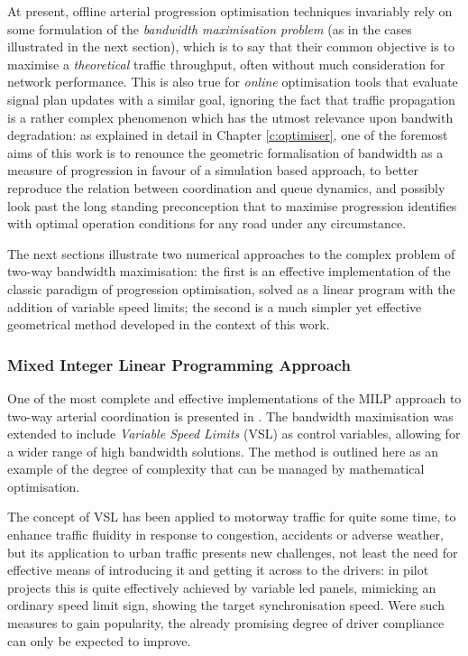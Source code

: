 At present, offline arterial progression optimisation techniques invariably rely on some formulation of the \emph{bandwidth maximisation problem} (as in the cases illustrated in the next section), which is to say that their common objective is to maximise a \emph{theoretical} traffic throughput, often without much consideration for network performance. This is also true for \emph{online} optimisation tools that evaluate signal plan updates with a similar goal, ignoring the fact that traffic propagation is a rather complex phenomenon which has the utmost relevance upon bandwith degradation: as explained in detail in Chapter \ref{c:optimiser}, one of the foremost aims of this work is to renounce the geometric formalisation of bandwidth as a measure of progression in favour of a simulation based approach, to better reproduce the relation between coordination and queue dynamics, and possibly look past the long standing preconception that to maximise progression identifies with optimal operation conditions for any road under any circumstance.

The next sections illustrate two numerical approaches to the complex problem of two-way bandwidth maximisation: the first is an effective implementation of the classic paradigm of progression optimisation, solved as a linear program with the addition of variable speed limits; the second is a much simpler yet effective geometrical method developed in the context of this work.

\subsubsection*{Mixed Integer Linear Programming Approach}
\newcommand{\tmod}[1]{{\| #1 \|}_t}
\newcommand{\intoffs}[1]{t_{#1}^{\scriptscriptstyle{\delta}}}
\newcommand{\reloffs}[1]{t_{#1}^{\scriptscriptstyle{\Delta}}}
One of the most complete and effective implementations of the MILP approach to two-way arterial coordination is presented in \citep{de2015arterial}. The bandwidth maximisation was extended to include \emph{Variable Speed Limits} (VSL) as control variables, allowing for a wider range of high bandwidth solutions. The method is outlined here as an example of the degree of complexity that can be managed by mathematical optimisation.

The concept of VSL has been applied to motorway traffic for quite some time, to enhance traffic fluidity in response to congestion, accidents or adverse weather, but its application to urban traffic presents new challenges, not least the need for effective means of introducing it and getting it across to the drivers: in pilot projects this is quite effectively achieved by variable led panels, mimicking an ordinary speed limit sign, showing the target synchronisation speed. Were such measures to gain popularity, the already promising degree of driver compliance can only be expected to improve.

